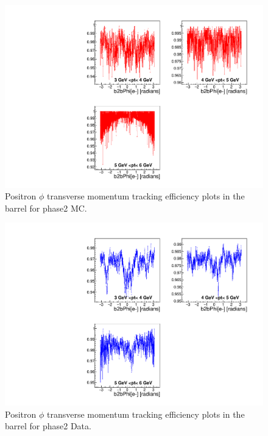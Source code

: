 \documentclass[a4paper,11pt,twosided,final,german,openbib,pdftex,listof=totoc,bibliography=totoc]{scrbook}
\begin{document}
\begin{appendix}
\begin{figure}[!htbp]
	\centering
	\includegraphics[width=\textwidth]{Plots/master/xPtMPhiepBarrel_MC}
	\caption[Transverse Momentum $\phi$ Positron Barrel Efficiency Phase2 MC]{Positron $\phi$ transverse momentum tracking efficiency plots in the barrel for phase2 MC.}
	\label{plt:PtMPhiepBarrel_MC}
\end{figure}


\begin{figure}[!htbp]
	\centering
	\includegraphics[width=\textwidth]{Plots/master/xPtMPhiepBarrel_Data}
	\caption[Transverse Momentum $\phi$ Positron Barrel Efficiency Phase2 Data]{Positron $\phi$ transverse  momentum tracking efficiency plots in the barrel for phase2 Data.}
	\label{plt:PtMPhiepBarrel_Data}
\end{figure}




\end{appendix}
\end{document}
